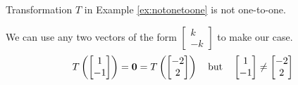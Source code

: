 \documentclass{ximera}
\renewcommand{\vec}[1]{{\bf #1}}
\begin{document}
\begin{example}
Transformation $T$ in Example \ref{ex:notonetoone} is not one-to-one.
\begin{explanation}
We can use any two vectors of the form $\begin{bmatrix}k\\-k\end{bmatrix}$ to make our case.  
$$T\left(\begin{bmatrix}1\\-1\end{bmatrix}\right)=\vec{0}=T\left(\begin{bmatrix}-2\\2\end{bmatrix}\right)\quad \text{but}\quad\begin{bmatrix}1\\-1\end{bmatrix}\neq \begin{bmatrix}-2\\2\end{bmatrix}$$
\end{explanation}
\end{example}
\end{document}

